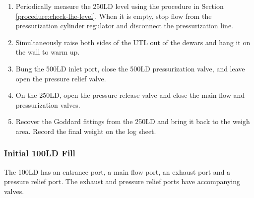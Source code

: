 \begin{enumerate}
 \item Periodically measure the 250LD level using the procedure in Section \ref{procedure:check-lhe-level}.  When it is empty, stop flow from the pressurization cylinder regulator and disconnect the pressurization line.
 \item Simultaneously raise both sides of the UTL out of the dewars and hang it on the wall to warm up.
 \item Bung the 500LD inlet port, close the 500LD pressurization valve, and leave open the pressure relief valve.
 \item On the 250LD, open the pressure release valve and close the main flow and pressurization valves.
 \item Recover the Goddard fittings from the 250LD and bring it back to the weigh area.  Record the final weight on the log sheet.
\end{enumerate}

\subsubsection{Initial 100LD Fill}

The 100LD has an entrance port, a main flow port, an exhaust port and a pressure relief port.  The exhaust and pressure relief ports have accompanying valves.
 
